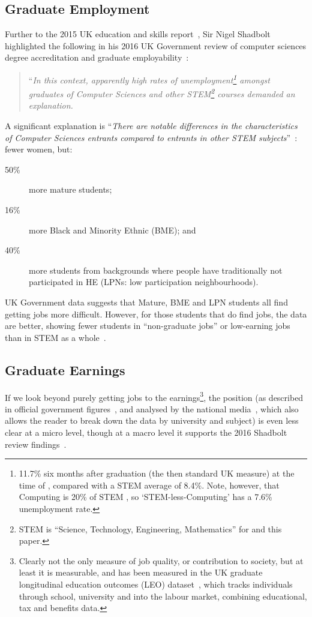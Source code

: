 \documentclass[conference]{IEEEtran}
\begin{document}
\subsection{Graduate Employment}

Further to the 2015 UK education and skills report~\cite{UKCES2015b},
Sir Nigel Shadbolt highlighted the following in his 2016 UK Government
review of computer sciences degree accreditation and graduate
employability~\cite{Shadbolt2016a}:

\begin{quote} ``{\emph{In this context, apparently high rates of
unemployment\footnote{11.7\% six months after graduation (the then standard
UK measure) at the time of \cite{Shadbolt2016a}, compared with a STEM
average of 8.4\%. Note, however, that Computing is 20\% of STEM
\cite[Table 1]{Wakeham2016a}, so `STEM-less-Computing' has a 7.6\%
unemployment rate.} amongst graduates of Computer Sciences and other
STEM\footnote{STEM is ``Science, Technology, Engineering,
Mathematics'' for \cite{Shadbolt2016a} and this paper.} courses
demanded an explanation.}}
\end{quote}

A significant explanation is ``{\emph{There are notable differences in the
characteristics of Computer Sciences entrants compared to entrants in
other STEM subjects}}''~\cite[\P2.6]{Shadbolt2016a}: fewer women, but:

\begin{description}
\item[50\% ]more mature students;
\item[16\% ]more Black and Minority Ethnic (BME); and
\item[40\% ]more students from backgrounds where people have
traditionally not participated in HE (LPNs: low participation
neighbourhoods).
\end{description}

UK Government data suggests that Mature, BME and LPN students all find
getting jobs more difficult. However, for those students that do find
jobs, the data are better, showing fewer students in ``non-graduate
jobs'' or low-earning jobs than in STEM as a whole~\cite[Figure
6]{Shadbolt2016a}.

\subsection{Graduate Earnings}
If we look beyond purely getting jobs to the earnings\footnote{Clearly
not the only measure of job quality, or contribution to society, but
at least it is measurable, and has been measured in the UK graduate
longitudinal education outcomes (LEO) dataset~\cite{DfE2017a}, which
tracks individuals through school, university and into the labour
market, combining educational, tax and benefits data.}, the position
(as described in official government figures~\cite{DfE2018d}, and
analysed by the national media~\cite{BBC2018f}, which also allows the
reader to break down the data by university and subject) is even less
clear at a micro level, though at a macro level it
supports the 2016 Shadbolt review findings~\cite{Shadbolt2016a}.
\end{document}
